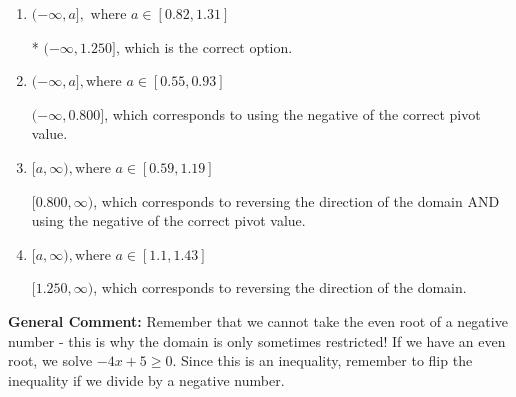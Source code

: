 \documentclass{extbook}[14pt]
\begin{document}
\begin{enumerate}
{\begin{enumerate}[label=\Alph*.]
This corresponds to the radical having an odd power, but the radical for this question is even.
\item \( (-\infty, a], \text{ where } a \in [0.82, 1.31] \)

* $(-\infty, 1.250]$, which is the correct option.
\item \( (-\infty, a], \text{where } a \in [0.55, 0.93] \)

$(-\infty, 0.800]$, which corresponds to using the negative of the correct pivot value.
\item \( [a, \infty), \text{where } a \in [0.59, 1.19] \)

$[0.800, \infty)$, which corresponds to reversing the direction of the domain AND using the negative of the correct pivot value.
\item \( [a, \infty), \text{where } a \in [1.1, 1.43] \)

 $[1.250, \infty)$, which corresponds to reversing the direction of the domain.
\end{enumerate}

\textbf{General Comment:} Remember that we cannot take the even root of a negative number - this is why the domain is only sometimes restricted! If we have an even root, we solve $-4 x + 5 \geq 0$. Since this is an inequality, remember to flip the inequality if we divide by a negative number.
}
\end{enumerate}
\end{document}
